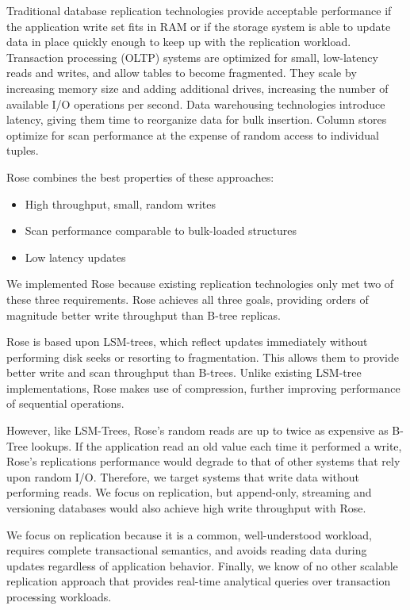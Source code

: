 \documentclass{vldb}
\newcommand{\rows}{Rose\xspace}
\newcommand{\rowss}{Rose's\xspace}
\begin{document}
Traditional database replication technologies provide acceptable
performance if the application write set fits in RAM or if the
storage system is able to update data in place quickly enough to keep
up with the replication workload.  Transaction processing (OLTP)
systems are optimized for small, low-latency reads and writes, and
allow tables to become fragmented.  They scale by increasing memory
size and adding additional drives, increasing the number of available
I/O operations per second.  Data warehousing technologies introduce
latency, giving them time to reorganize data for bulk insertion.
Column stores optimize for scan performance at the expense of random
access to individual tuples.

\rows combines the best properties of these approaches:

\begin{itemize}
\item High throughput, small, random writes
\item Scan performance comparable to bulk-loaded structures
\item Low latency updates
\end{itemize}

We implemented \rows because existing replication technologies
only met two of these three requirements.  \rows achieves all three
goals, providing orders of magnitude better write throughput than
B-tree replicas.

\rows is based upon LSM-trees, which reflect updates
immediately without performing disk seeks or resorting to
fragmentation.  This allows them to provide better write and scan
throughput than B-trees.  Unlike existing LSM-tree implementations,
\rows makes use of compression, further improving performance of sequential operations.

However, like LSM-Trees, \rowss random reads are up to twice as
expensive as B-Tree lookups.  If the application read an old value
each time it performed a write, \rowss replications performance would
degrade to that of other systems that rely upon random I/O.
Therefore, we target systems that write data without performing reads.
We focus on replication, but append-only, streaming and versioning
databases would also achieve high write throughput with \rows.

We focus on replication because it is a common, well-understood
workload, requires complete transactional semantics, and avoids
reading data during updates regardless of application behavior.
Finally, we know of no other scalable replication approach that
provides real-time analytical queries over transaction
processing workloads.
\end{document}
